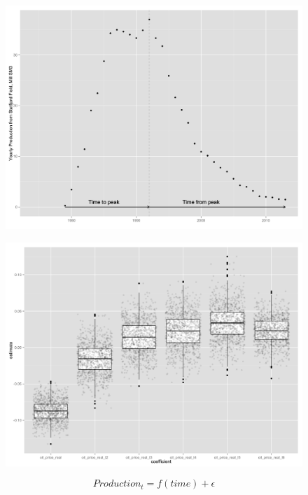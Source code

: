 \documentclass{beamer}
\begin{document}
\begin{frame}[plain]
	\begin{figure}
	\includegraphics[width=.8\textwidth]{figures/statfjord_dem.png}
	
	\label{statfjord_dem}
	\end{figure}
\end{frame}


\begin{frame}[plain]
	\begin{figure}
	\includegraphics[width=.8\textwidth]{figures/glm_dirty_box.png}
	
	\label{glm_dirty_box}
	\end{figure}
\end{frame}


\begin{frame}[plain]
	\begin{equation}
	Production_{t}=f(time) + \epsilon
		\label{simp_eqn}
	\end{equation}
\end{frame}
\end{document}
